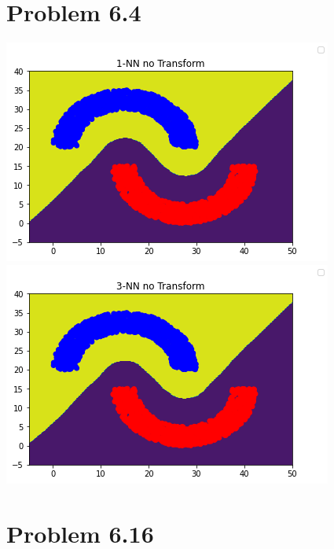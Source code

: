 \documentclass{article}
\begin{document}
\section{Problem 6.4}

\includegraphics[]{2/1} \\
\includegraphics[]{2/2}

\section{Problem 6.16}
\end{document}
